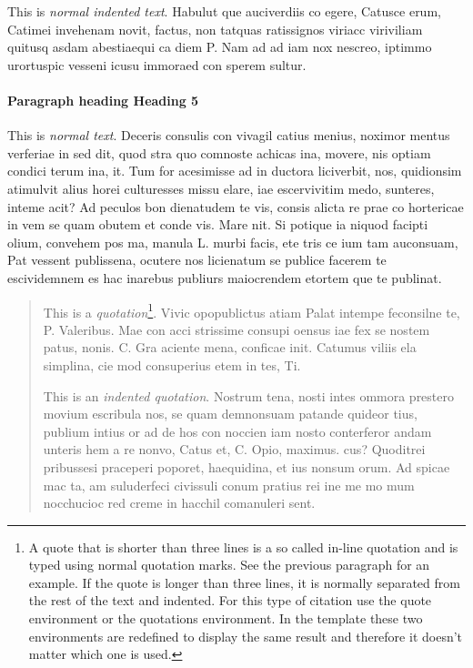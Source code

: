 This is \emph{normal indented text}. Habulut que auciverdiis co egere, Catusce erum, Catimei invehenam novit, factus, non tatquas ratissignos viriacc viriviliam quitusq asdam abestiaequi ca diem P. Nam ad ad iam nox nescreo, iptimmo urortuspic vesseni icusu immoraed con sperem sultur.
    
\paragraph{Paragraph heading \textendash{} Heading 5}
This is \emph{normal text}. Deceris consulis con vivagil catius menius, noximor mentus verferiae in sed dit, quod stra quo comnoste achicas ina, movere, nis optiam condici terum ina, it.
Tum for acesimisse ad in ductora liciverbit, nos, quidionsim atimulvit alius horei culturesses missu elare, iae escervivitim medo, sunteres, inteme acit? Ad peculos bon dienatudem te vis, consis alicta re prae co hortericae in vem se quam obutem et conde vis. Mare nit. Si potique ia niquod facipti olium, convehem pos ma, manula L. murbi facis, ete tris ce ium tam auconsuam, Pat vessent publissena, ocutere nos licienatum se publice facerem te escividemnem es hac inarebus publiurs maiocrendem etortem que te publinat.
    



\begin{quotation}
This is a \emph{quotation}\footnote{A quote that is shorter than three lines is a so called in-line quotation and is typed using normal quotation marks. See the previous paragraph for an example. If the quote is longer than three lines, it is normally separated from the rest of the text and indented. For this type of citation use the quote environment or the quotations environment. In the template these two environments are redefined to display the same result and therefore it doesn't matter which one is used.}. Vivic opopublictus atiam Palat intempe feconsilne te, P. Valeribus. Mae con acci strissime consupi oensus iae fex se nostem patus, nonis. C. Gra aciente mena, conficae init. Catumus viliis ela simplina, cie mod consuperius etem in tes, Ti. 

This is an \emph{indented quotation}. Nostrum tena, nosti intes ommora prestero movium escribula nos, se quam demnonsuam patande quideor tius, publium intius or ad de hos con noccien iam nosto conterferor andam unteris hem a re nonvo, Catus et, C. Opio, maximus. cus? Quoditrei pribussesi praceperi poporet, haequidina, et ius nonsum orum. Ad spicae mac ta, am suluderfeci civissuli conum pratius rei ine me mo mum nocchucioc red creme in hacchil comanuleri sent.
\end{quotation}

